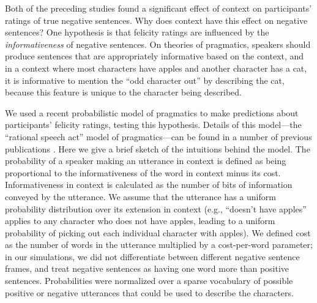 \documentclass[10pt,letterpaper]{article}
\begin{document}
Both of the preceding studies found a significant effect of context on participants' ratings of true negative sentences.  Why does context have this effect on negative sentences?  One hypothesis is that felicity ratings are influenced by the \emph{informativeness} of negative sentences. On theories of pragmatics, speakers should produce sentences that are appropriately informative based on the context, and in a context where most characters have apples and another character has a cat, it is informative to mention the ``odd character out'' by describing the cat, because this feature is unique to the character being described.




We used a recent probabilistic model of pragmatics to make predictions about participants' felicity ratings, testing this hypothesis. Details of this model---the ``rational speech act'' model of pragmatics---can be found in a number of previous publications \cite{frank2012,goodman2013,nordmeyer2014a}. Here we give a brief sketch of the intuitions behind the model. The probability of a speaker making an utterance in context is defined as being  proportional to the informativeness of the word in context minus its cost.  Informativeness in context is calculated as the number of bits of information conveyed by the utterance.  We assume that the utterance has a uniform probability distribution over its extension in context (e.g., ``doesn't have apples'' applies to any character who does not have apples, leading to a uniform probability of picking out each individual character with apples). We defined cost as the number of words in the utterance multiplied by a cost-per-word parameter; in our simulations, we did not differentiate between different negative sentence frames, and treat negative sentences as having one word more than positive sentences.  Probabilities were normalized over a sparse vocabulary of possible positive or negative utterances that could be used to describe the characters.
\end{document}
